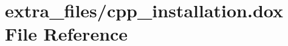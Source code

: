 \hypertarget{cpp__installation_8dox}{}\section{extra\+\_\+files/cpp\+\_\+installation.dox File Reference}
\label{cpp__installation_8dox}
